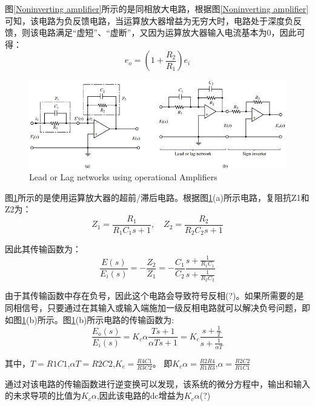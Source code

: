 \documentclass{article}
\numberwithin{equation}{section}
\numberwithin{figure}{section}
\begin{document}
图\ref{Noninverting amplifier}所示的是同相放大电路，根据图\ref{Noninverting amplifier}可知，该电路为负反馈电路，当运算放大器增益为无穷大时，电路处于深度负反馈，则该电路满足“虚短”、“虚断”，又因为运算放大器输入电流基本为0，因此可得：
\begin{equation}
    e_o=(1+\frac{R_2}{R_1})e_i
\end{equation}

\begin{figure}
    \centering
    \includegraphics[width=.9\textwidth]{Chapter3/LeadorLagnetwork.png} %
    \caption{Lead or Lag networks using operational Amplifiers} %
    \label{LeadorLagnetwork} %
\end{figure}

图\ref{LeadorLagnetwork}所示的是使用运算放大器的超前/滞后电路。根据图\ref{LeadorLagnetwork}(a)所示电路，复阻抗Z1和Z2为：
\begin{equation}
    Z_1=\frac{R_1}{R_1C_1s+1}, \quad Z_2=\frac{R_2}{R_2C_2s+1}
\end{equation}

因此其传输函数为：
\begin{equation}
    \frac{E(s)}{E_i(s)}=-\frac{Z_2}{Z_1}=-\frac{C_1}{C_2}\frac{s+\frac{1}{R_1C_1}}{s+\frac{1}{R_2C_2}}
\end{equation}

由于其传输函数中存在负号，因此这个电路会导致符号反相(?)。如果所需要的是同相信号，只要通过在其输入或输入端施加一级反相电路就可以解决负号问题，即如图\ref{LeadorLagnetwork}(b)所示。图\ref{LeadorLagnetwork}(b)所示电路的传输函数为:
\begin{equation}
        \frac{E_o(s)}{E_i(s)}=K_c\alpha \frac{Ts+1}{\alpha Ts+1}=K_c\frac{s+\frac{1}{T}}{s+\frac{1}{\alpha T}}\label{leadorlag}
\end{equation}

其中，$T=R1C1$,\quad $\alpha T=R2C2$,\quad $K_c=\frac{R4C1}{R3C2}$。
即$K_c\alpha =\frac{R2R4}{R1R3}$,\quad $\alpha =\frac{R2C2}{R1C1}$

通过对该电路的传输函数进行逆变换可以发现，该系统的微分方程中，输出和输入的未求导项的比值为$K_c\alpha$,因此该电路的dc增益为$K_c\alpha$(?)
\end{document}
